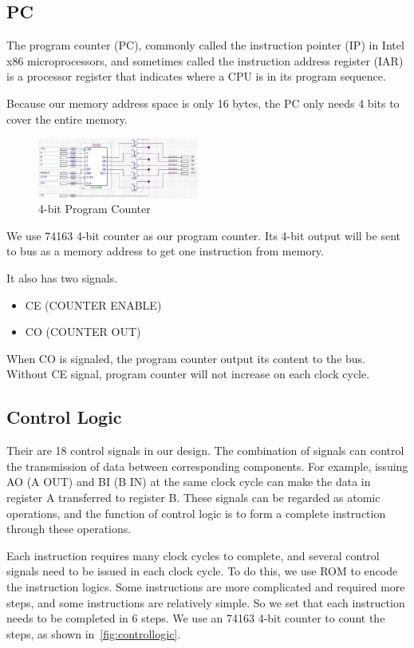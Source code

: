 \subsection{PC}

The program counter (PC), commonly called the instruction pointer (IP) in Intel x86 microprocessors, and sometimes called the instruction address register (IAR) is a processor register that indicates where a CPU is in its program sequence.

Because our memory address space is only 16 bytes, the PC only needs 4 bits to cover the entire memory.

\begin{figure}[th]
	\includegraphics[width=0.47\textwidth]{figures/pc}
	\centering
	\caption{4-bit Program Counter}
	\label{fig:pc}
\end{figure}

We use 74163 4-bit counter as our program counter. Its 4-bit output will be sent to bus as a memory address to get one instruction from memory.

It also has two signals.

\begin{itemize}
	\item CE (COUNTER ENABLE)
	\item CO (COUNTER OUT)
\end{itemize}

When CO is signaled, the program counter output its content to the bus. Without CE signal, program counter will not increase on each clock cycle.


\subsection{Control Logic}

Their are 18 control signals in our design. The combination of signals can control the transmission of data between corresponding components. For example, issuing AO (A OUT) and BI (B IN) at the same clock cycle can make the data in register A transferred to register B. These signals can be regarded as atomic operations, and the function of control logic is to form a complete instruction through these operations.

Each instruction requires many clock cycles to complete, and several control signals need to be issued in each clock cycle. To do this, we use ROM to encode the instruction logics. Some instructions are more complicated and required more steps, and some instructions are relatively simple. So we set that each instruction needs to be completed in 6 steps. We use an 74163 4-bit counter to count the steps, as shown in~\autoref{fig:controllogic}.

